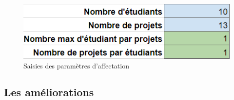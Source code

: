 \documentclass{polytech/polytech}
\begin{document}
\begin{figure}
\includegraphics[width=12cm]{images/interface_parametres}
\caption{\label{fig:interface_parametres} Saisies des paramètres d'affectation}
\end{figure}



\subsection{Les améliorations}



\end{document}
